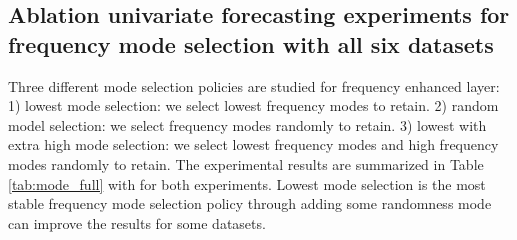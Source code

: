 \documentclass{article}
\begin{document}
\subsection{Ablation univariate forecasting experiments for frequency mode selection with all six datasets}
Three different mode selection policies are studied for frequency enhanced layer: 1) lowest mode selection: we select  lowest frequency modes to retain. 2) random model selection: we select  frequency modes randomly to retain. 3) lowest with extra high mode selection: we select  lowest frequency modes and  high frequency modes randomly to retain. The experimental results are summarized in Table \ref{tab:mode_full} with  for both experiments. Lowest mode selection is the most stable frequency mode selection policy through adding some randomness mode can improve the results for some datasets.
\end{document}
